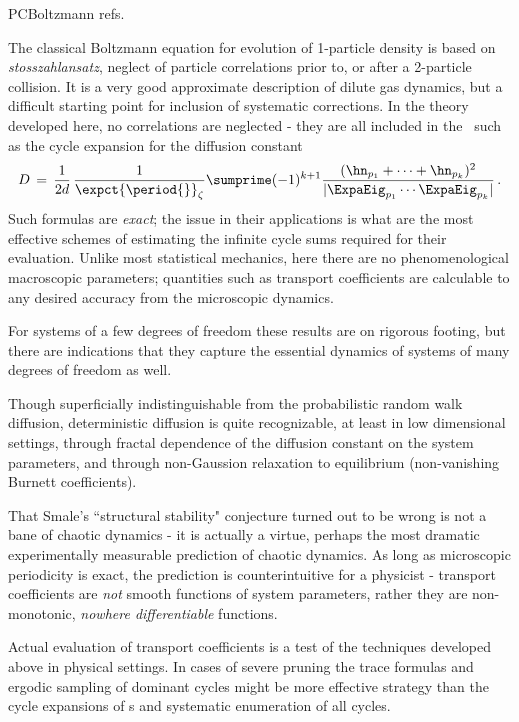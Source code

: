 PC{Boltzmann refs.}


The classical Boltzmann equation for evolution of 1-particle density
is based on {\em stosszahlansatz}, neglect of particle correlations
prior to, or after a 2-particle collision.   It
is a very good approximate description of dilute gas dynamics, but a
difficult starting point for inclusion of systematic corrections.
 In the theory developed here, no
correlations are neglected - they are all included in the \cycForm\
such as the cycle expansion for the diffusion constant
\[
D \,=\,{1 \over 2 d } \, {1 \over \expct{\period{}}_\zeta} \sumprime
(-1)^{k+1} \frac{ (\hn_{p_1} + \cdots + \hn_{p_k})^2 }{
  |\ExpaEig_{p_1} \cdots\ExpaEig_{p_k}| } \, .
\]
Such formulas are {\em exact}; the issue in their applications is what
are the most effective schemes of estimating the infinite cycle sums
required for their evaluation. Unlike most statistical mechanics, here
there are no phenomenological macroscopic parameters; quantities such
as transport coefficients are calculable to any desired accuracy from
the microscopic dynamics.

For systems of a few degrees of freedom these results are on rigorous
footing, but there are indications that they capture the essential
dynamics of systems of many degrees of freedom as well.

Though superficially indistinguishable from the probabilistic random
walk diffusion, deterministic diffusion is quite recognizable, at
least in low dimensional settings, through fractal dependence of the
diffusion constant on the system parameters, and through non-Gaussion
relaxation to equilibrium (non-vanishing Burnett coefficients).

That Smale's ``structural stability" conjecture turned out to be wrong
is not a bane of chaotic dynamics - it is actually a virtue, perhaps
the most dramatic experimentally measurable prediction of chaotic
dynamics. As long as microscopic periodicity is exact, the prediction
is counterintuitive for a physicist - transport coefficients are {\em
  not} smooth functions of system parameters, rather they are
non-monotonic, {\em nowhere differentiable} functions.

Actual evaluation of transport coefficients is a test of the
techniques developed above in physical settings. In cases of severe
pruning the trace formulas and ergodic sampling of dominant cycles
might be more effective strategy than the cycle expansions of \dzeta s
and systematic enumeration of all cycles.


